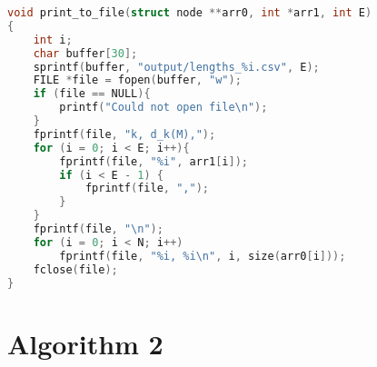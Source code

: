 \begin{lstlisting}[language=C]
void print_to_file(struct node **arr0, int *arr1, int E)
{
    int i;
    char buffer[30];
    sprintf(buffer, "output/lengths_%i.csv", E);
    FILE *file = fopen(buffer, "w");
    if (file == NULL){
        printf("Could not open file\n");
    }
    fprintf(file, "k, d_k(M),");
    for (i = 0; i < E; i++){
        fprintf(file, "%i", arr1[i]);
        if (i < E - 1) {
            fprintf(file, ",");
        }
    }
    fprintf(file, "\n");
    for (i = 0; i < N; i++)
        fprintf(file, "%i, %i\n", i, size(arr0[i]));
    fclose(file);
}
\end{lstlisting}    

\newpage

\section{Algorithm 2}


